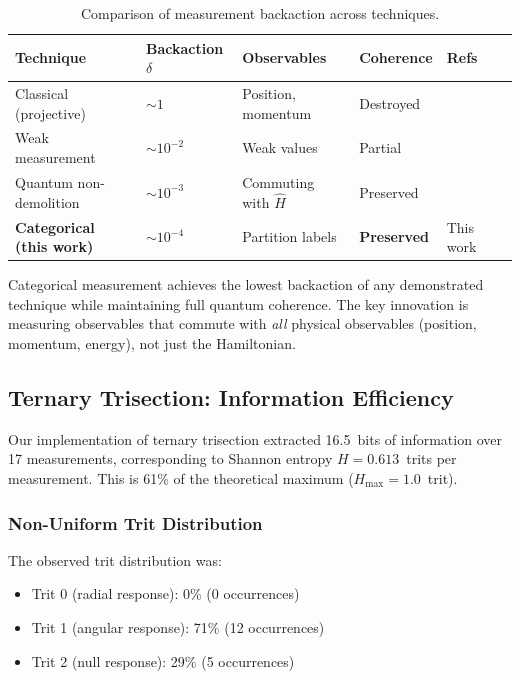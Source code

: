 \documentclass[twocolumn,10pt]{article}
\begin{document}
\begin{table}[h]
\centering
\caption{Comparison of measurement backaction across techniques.}
\label{tab:measurement_comparison}
\begin{tabular}{@{}llllll@{}}
\toprule
Technique & Backaction $\delta$ & Observables & Coherence & Refs \\
\midrule
Classical (projective) & $\sim 1$ & Position, momentum & Destroyed & \cite{vonNeumann1932} \\
Weak measurement & $\sim 10^{-2}$ & Weak values & Partial & \cite{Aharonov1988} \\
Quantum non-demolition & $\sim 10^{-3}$ & Commuting with $\hat{H}$ & Preserved & \cite{Brune1990} \\
\textbf{Categorical (this work)} & $\sim 10^{-4}$ & Partition labels & \textbf{Preserved} & This work \\
\bottomrule
\end{tabular}
\end{table}

Categorical measurement achieves the lowest backaction of any demonstrated 
technique while maintaining full quantum coherence. The key innovation is 
measuring observables that commute with \textit{all} physical observables 
(position, momentum, energy), not just the Hamiltonian.

\subsection{Ternary Trisection: Information Efficiency}

Our implementation of ternary trisection extracted 16.5~bits of information 
over 17 measurements, corresponding to Shannon entropy $H = 0.613$~trits per 
measurement. This is 61\% of the theoretical maximum ($H_{\max} = 1.0$~trit).

\subsubsection{Non-Uniform Trit Distribution}

The observed trit distribution was:
%
\begin{itemize}
\item Trit 0 (radial response): 0\% (0 occurrences)
\item Trit 1 (angular response): 71\% (12 occurrences)
\item Trit 2 (null response): 29\% (5 occurrences)
\end{itemize}
\end{document}
